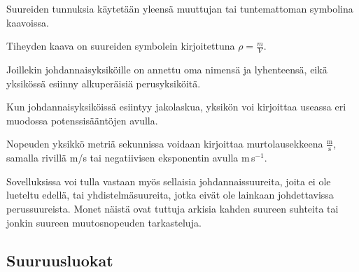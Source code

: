 Suureiden tunnuksia käytetään yleensä muuttujan tai tuntemattoman symbolina kaavoissa.

\begin{esimerkki}
Tiheyden kaava on suureiden symbolein kirjoitettuna $\rho=\frac{m}{V}$.
\end{esimerkki}

Joillekin johdannaisyksiköille on annettu oma nimensä ja lyhenteensä, eikä yksikössä esiinny alkuperäisiä perusyksiköitä. 

\begin{esimerkki}
\end{esimerkki}

Kun johdannaisyksiköissä esiintyy jakolaskua, yksikön voi kirjoittaa useassa eri muodossa potenssisääntöjen avulla.

\begin{esimerkki}
Nopeuden yksikkö metriä sekunnissa voidaan kirjoittaa murtolausekkeena $\frac{\text{m}}{\text{s}}$, samalla rivillä m/s tai negatiivisen eksponentin avulla m\,s$^{-1}$.
\end{esimerkki}

Sovelluksissa voi tulla vastaan myös sellaisia johdannaissuureita, joita ei ole lueteltu edellä, tai yhdistelmäsuureita, jotka eivät ole lainkaan johdettavissa perussuureista. Monet näistä ovat tuttuja arkisia kahden suureen suhteita tai jonkin suureen muutosnopeuden tarkasteluja.

\begin{esimerkki}
\end{esimerkki}

\subsection*{Suuruusluokat}

